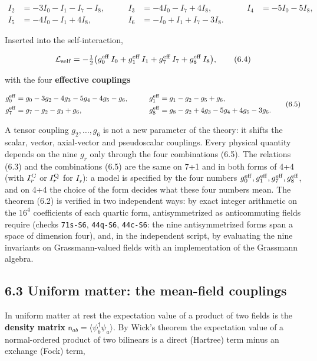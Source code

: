 \documentclass[
  10pt,
]{article}
\begin{document}
\[\begin{aligned}
I_2&=-3I_0-I_1-I_7-I_8,&\qquad I_3&=-4I_0-I_7+4I_8,&\qquad I_4&=-5I_0-5I_8,\\
I_5&=-4I_0-I_1+4I_8,&\qquad I_6&=-I_0+I_1+I_7-3I_8.
\end{aligned}\tag{6.3}\]

Inserted into the self-interaction,

\[\mathcal L_{\rm self}=-\tfrac12\big(g_0^{\rm eff}\,I_0+g_1^{\rm eff}\,I_1+g_7^{\rm eff}\,I_7+g_8^{\rm eff}\,I_8\big),\tag{6.4}\]

with the four \textbf{effective couplings}

\[\begin{aligned}
g_0^{\rm eff}&=g_0-3g_2-4g_3-5g_4-4g_5-g_6,&\qquad g_1^{\rm eff}&=g_1-g_2-g_5+g_6,\\
g_7^{\rm eff}&=g_7-g_2-g_3+g_6,&\qquad g_8^{\rm eff}&=g_8-g_2+4g_3-5g_4+4g_5-3g_6.
\end{aligned}\tag{6.5}\]

A tensor coupling \(g_2,\dots,g_6\) is not a new parameter of the
theory: it shifts the scalar, vector, axial-vector and pseudoscalar
couplings. Every physical quantity depends on the nine \(g_r\) only
through the four combinations (6.5). The relations (6.3) and the
combinations (6.5) are the same on 7+1 and in both forms of 4+4 (with
\(I_r^{\rm C}\) or \(I_r^{\rm Q}\) for \(I_r\)): a model is specified by
the four numbers
\(g_0^{\rm eff},g_1^{\rm eff},g_7^{\rm eff},g_8^{\rm eff}\), and on 4+4
the choice of the form decides what these four numbers mean. The theorem
(6.2) is verified in two independent ways: by exact integer arithmetic
on the \(16^4\) coefficients of each quartic form, antisymmetrized as
anticommuting fields require (checks \texttt{71s-S6}, \texttt{44q-S6},
\texttt{44c-S6}: the nine antisymmetrized forms span a space of
dimension four), and, in the independent script, by evaluating the nine
invariants on Grassmann-valued fields with an implementation of the
Grassmann algebra.

\hypertarget{uniform-matter-the-mean-field-couplings}{%
\subsection{6.3 Uniform matter: the mean-field
couplings}\label{uniform-matter-the-mean-field-couplings}}

In uniform matter at rest the expectation value of a product of two
fields is the \textbf{density matrix}
\(\mathsf n_{ab}=\langle\psi_b^\dagger\psi_a\rangle\). By Wick's theorem
the expectation value of a normal-ordered product of two bilinears is a
direct (Hartree) term minus an exchange (Fock) term,
\end{document}
